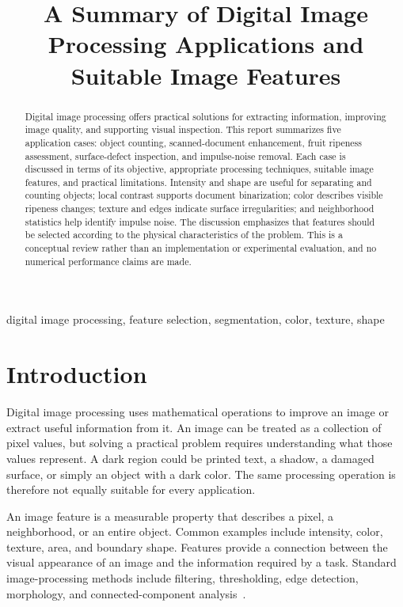 \documentclass[conference]{IEEEtran}
\title{A Summary of Digital Image Processing Applications and Suitable Image Features}
\author{\IEEEauthorblockN{Malvino Rosana Pasquale}
\IEEEauthorblockA{Student Number: 25/569865/PA/24015\\Digital Image Processing Course\\Assignment 4}}
\begin{document}
\maketitle
\begin{abstract}
Digital image processing offers practical solutions for extracting information, improving image quality, and supporting visual inspection. This report summarizes five application cases: object counting, scanned-document enhancement, fruit ripeness assessment, surface-defect inspection, and impulse-noise removal. Each case is discussed in terms of its objective, appropriate processing techniques, suitable image features, and practical limitations. Intensity and shape are useful for separating and counting objects; local contrast supports document binarization; color describes visible ripeness changes; texture and edges indicate surface irregularities; and neighborhood statistics help identify impulse noise. The discussion emphasizes that features should be selected according to the physical characteristics of the problem. This is a conceptual review rather than an implementation or experimental evaluation, and no numerical performance claims are made.
\end{abstract}
\begin{IEEEkeywords}
digital image processing, feature selection, segmentation, color, texture, shape
\end{IEEEkeywords}

\section{Introduction}
Digital image processing uses mathematical operations to improve an image or extract useful information from it. An image can be treated as a collection of pixel values, but solving a practical problem requires understanding what those values represent. A dark region could be printed text, a shadow, a damaged surface, or simply an object with a dark color. The same processing operation is therefore not equally suitable for every application.

An image feature is a measurable property that describes a pixel, a neighborhood, or an entire object. Common examples include intensity, color, texture, area, and boundary shape. Features provide a connection between the visual appearance of an image and the information required by a task. Standard image-processing methods include filtering, thresholding, edge detection, morphology, and connected-component analysis~\cite{gonzalez}.
\end{document}
